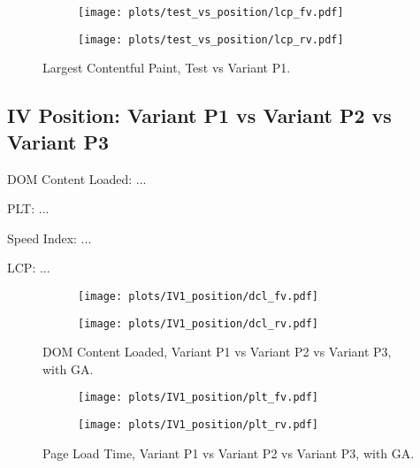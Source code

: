 \begin{figure}
	\centering
	\begin{subfigure}{.5\textwidth}
		\centering
		\texttt{[image: plots/test\_vs\_position/lcp\_fv.pdf]}
		\label{fig:sub1}
	\end{subfigure}%
	\begin{subfigure}{.5\textwidth}
		\centering
		\texttt{[image: plots/test\_vs\_position/lcp\_rv.pdf]}
		\label{fig:sub2}
	\end{subfigure}
	\caption{Largest Contentful Paint, Test vs Variant P1.}
	\label{figure:plt_original_test}
\end{figure}


\clearpage



\subsection{IV Position: Variant P1 vs Variant P2 vs Variant P3}





DOM Content Loaded: ...

PLT: ...

Speed Index: ...

LCP: ...

\begin{figure}
	\centering
	\begin{subfigure}{.5\textwidth}
		\centering
		\texttt{[image: plots/IV1\_position/dcl\_fv.pdf]}
		\label{fig:sub1}
	\end{subfigure}%
	\begin{subfigure}{.5\textwidth}
		\centering
		\texttt{[image: plots/IV1\_position/dcl\_rv.pdf]}
		\label{fig:sub2}
	\end{subfigure}
	\caption{DOM Content Loaded, Variant P1 vs Variant P2 vs Variant P3, with GA.}
	\label{figure:plt_original_test}
\end{figure}


\begin{figure}
	\centering
	\begin{subfigure}{.5\textwidth}
		\centering
		\texttt{[image: plots/IV1\_position/plt\_fv.pdf]}
		\label{fig:sub1}
	\end{subfigure}%
	\begin{subfigure}{.5\textwidth}
		\centering
		\texttt{[image: plots/IV1\_position/plt\_rv.pdf]}
		\label{fig:sub2}
	\end{subfigure}
	\caption{Page Load Time, Variant P1 vs Variant P2 vs Variant P3, with GA.}
	\label{figure:plt_original_test}
\end{figure}


